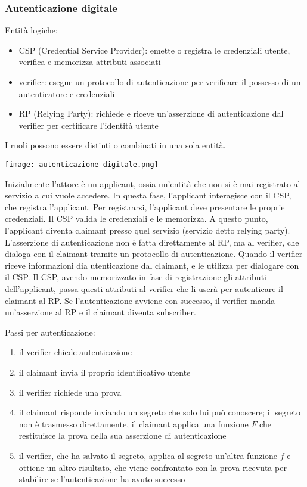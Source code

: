 \documentclass[11pt]{article}
\begin{document}
\subsubsection{Autenticazione digitale}
Entità logiche:
\begin{itemize}
    \item CSP (Credential Service Provider): emette o registra le credenziali utente, verifica e memorizza attributi associati 
    \item verifier: esegue un protocollo di autenticazione per verificare il possesso di un autenticatore e credenziali 
    \item RP (Relying Party): richiede e riceve un'asserzione di autenticazione dal verifier per certificare l'identità utente 
\end{itemize}
I ruoli possono essere distinti o combinati in una sola entità.
\begin{center}
    \texttt{[image: autenticazione digitale.png]}
\end{center}
Inizialmente l'attore è un applicant, ossia un'entità che non si è mai registrato al servizio a cui vuole accedere. In questa 
fase, l'applicant interagisce con il CSP, che registra l'applicant. Per registrarsi, l'applicant deve presentare le proprie 
credenziali. Il CSP valida le credenziali e le memorizza. A questo punto, l'applicant diventa claimant presso quel servizio
(servizio detto relying party). L'asserzione di autenticazione non è fatta direttamente al RP, ma al verifier, che dialoga 
con il claimant tramite un protocollo di autenticazione. Quando il verifier riceve informazioni dia utenticazione dal claimant, 
e le utilizza per dialogare con il CSP. Il CSP, avendo memorizzato in fase di registrazione gli attributi dell'applicant, 
passa questi attributi al verifier che li userà per autenticare il claimant al RP. Se l'autenticazione avviene con successo,
il verifier manda un'asserzione al RP e il claimant diventa subscriber.

Passi per autenticazione:
\begin{enumerate}
    \item il verifier chiede autenticazione 
    \item il claimant invia il proprio identificativo utente 
    \item il verifier richiede una prova 
    \item il claimant risponde inviando un segreto che solo lui può conoscere; il segreto non è trasmesso direttamente, 
    il claimant applica una funzione $F$ che restituisce la prova della sua asserzione di autenticazione 
    \item il verifier, che ha salvato il segreto, applica al segreto un'altra funzione $f$ e ottiene un altro risultato, che
    viene confrontato con la prova ricevuta per stabilire se l'autenticazione ha avuto successo 
\end{enumerate}
\end{document}
